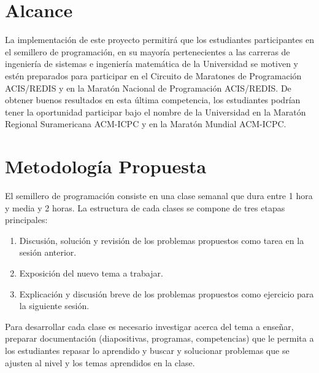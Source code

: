 \documentclass[11pt, oneside]{article}
\theoremstyle{definition}
\theoremstyle{remark}
\begin{document}
\section{Alcance}
La implementación de este proyecto permitirá que los estudiantes participantes en el semillero de programación, en su mayoría pertenecientes a las carreras de ingeniería de sistemas e ingeniería matemática de la Universidad se motiven y estén preparados para participar en el Circuito de Maratones de Programación ACIS/REDIS y en la Maratón Nacional de Programación ACIS/REDIS. De obtener buenos resultados en esta última competencia, los estudiantes podrían tener la oportunidad participar bajo el nombre de la Universidad en la Maratón Regional Suramericana ACM-ICPC y en la Maratón Mundial ACM-ICPC.

\section{Metodología Propuesta}
El semillero de programación consiste en una clase semanal que dura entre 1 hora y media y 2 horas. La estructura de cada clases se compone de tres etapas principales:
\begin{enumerate}
	\item{Discusión, solución y revisión de los problemas propuestos como tarea en la sesión anterior.}
	\item{Exposición del nuevo tema a trabajar.}
	\item{Explicación y discusión breve de los problemas propuestos como ejercicio para la siguiente sesión.}
\end{enumerate}
Para desarrollar cada clase es necesario investigar acerca del tema a enseñar, preparar documentación (diapositivas, programas, competencias) que le permita a los estudiantes repasar lo aprendido y buscar y solucionar problemas que se ajusten al nivel y los temas aprendidos en la clase.
\end{document}
